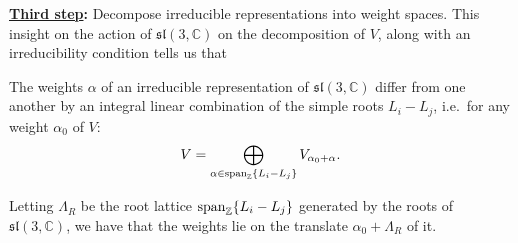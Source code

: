 \documentclass{report}
\begin{document}
{\bf \underline{Third step}:} Decompose irreducible representations into weight spaces.
This insight on the action of $\mathfrak{sl}(3, \mathbb C)$ on the decomposition of $V$, along with an irreducibility condition tells us that 
\begin{center}
    The weights $\alpha$ of an irreducible representation of $\mathfrak{sl}(3, \mathbb C)$ differ from one another by an integral linear combination of the simple roots $L_i - L_j$, i.e.\ for any weight $\alpha_0$ of $V$:
    \[
    V = \bigoplus_{\alpha \in \operatorname{span}_{\mathbb Z} \{L_i - L_j\}} V_{\alpha_0 + \alpha}.
    \]
\end{center}
Letting $\Lambda_R$ be the root lattice $\operatorname{span}_{\mathbb Z} \{L_i - L_j\}$ generated by the roots of $\mathfrak{sl}(3, \mathbb C)$, we have that the weights lie on the translate $\alpha_0 + \Lambda_R$ of it.
\end{document}

